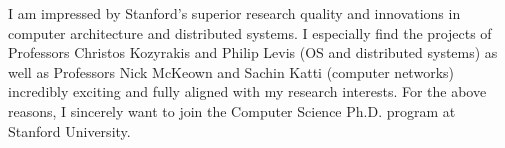 I am impressed by Stanford's superior research quality and innovations in computer architecture and distributed systems. I especially find the projects of Professors Christos Kozyrakis and Philip Levis (OS and distributed systems) as well as Professors Nick McKeown and Sachin Katti (computer networks) incredibly exciting and fully aligned with my research interests. For the above reasons, I sincerely want to join the Computer Science Ph.D. program at Stanford University.